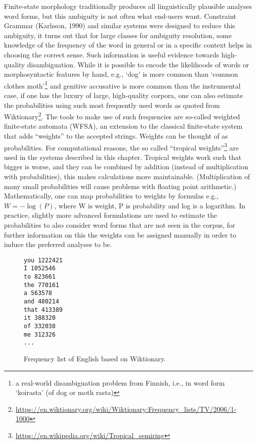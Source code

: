 \documentclass[free]{flammie}
\begin{document}
Finite-state morphology traditionally produces all linguistically plausible
analyses word forms, but this ambiguity is not often what end-users want.
Constraint Grammar (Karlsson, 1990) and similar systems were designed to reduce
this ambiguity, it turns out that for large classes for ambiguity resolution,
some knowledge of the frequency of the word in general or in a specific context
helps in choosing the correct sense. Such information is useful evidence towards
high-quality disambiguation. While it is possible to encode the likelihoods of
words or morphosyntactic features by hand, e.g., ‘dog’ is more common than
‘common clothes moth’\footnote{a real-world disambiguation problem from Finnish,
i.e., in word form ‘koirasta’ (of dog or moth rasta)} and genitive accusative is
more common than the instrumental case, if one has the luxury of large,
high-quality corpora, one can also estimate the probabilities using such most
frequently used words as quoted from
Wiktionary\footnote{\url{https://en.wiktionary.org/wiki/Wiktionary:Frequency_lists/TV/2006/1-1000}}.
The tools to make use of such frequencies are so-called weighted finite-state
automata (WFSA), an extension to the classical finite-state system that adds
“weights” to the accepted strings.  Weights can be thought of as probabilities.
For computational reasons, the so called “tropical
weights”\footnote{\url{https://en.wikipedia.org/wiki/Tropical_semiring}} are
used in the systems described in this chapter. Tropical weights work such that
bigger is worse, and they can be combined by addition (instead of multiplication
with probabilities), this makes calculations more maintainable. (Multiplication
of many small probabilities will cause problems with floating point arithmetic.)
Mathematically, one can map probabilities to weights by formulas e.g., $W =
-\log(P)$, where W is weight, P is probability and log is a logarithm. In
practice, slightly more advanced formulations are used to estimate the
probabilities to also consider word forms that are not seen in the corpus, for
further information on this the weights can be assigned manually in order to
induce the preferred analyses to be.

\begin{figure}
    \begin{verbatim}
you 1222421
I 1052546
to 823661
the 770161
a 563578
and 480214
that 413389
it 388320
of 332038
me 312326
...
\end{verbatim}
    \caption{Frequency list of English based on Wiktionary.\label{fig:freq}}
\end{figure}
\end{document}
